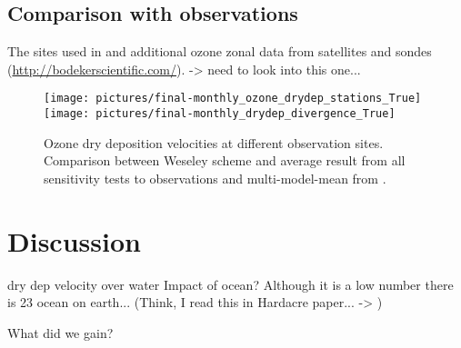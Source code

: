 \documentclass[gmd, manuscript]{copernicus}
\begin{document}
\subsection{Comparison with observations}
\label{subsec:obs}
The sites used in \citet{ACP:Hardacre2015} and additional ozone zonal data from satellites and sondes (\url{http://bodekerscientific.com/}). \citep{AE:Hu2017} -> need to look into this one...

\begin{figure}[t]
  \texttt{[image: pictures/final-monthly\_ozone\_drydep\_stations\_True]}\\
  \texttt{[image: pictures/final-monthly\_drydep\_divergence\_True]}
  \caption{Ozone dry deposition velocities at different observation sites. Comparison between Weseley scheme and average result from all sensitivity tests to observations and multi-model-mean from \citet{ACP:Hardacre2015}.}
  \label{fig:mmm_drydep_stations}
\end{figure}


\section{Discussion}
\label{sec:disc}
dry dep velocity over water \citep{JGR:Helmig2012} Impact of ocean? Although it is a low number there is 2\/3 ocean on earth... (Think, I read this in Hardacre paper... -> \citet{ACP:Luhar2017})




\conclusions  %
\label{sec:conc}
What did we gain?


\end{document}
